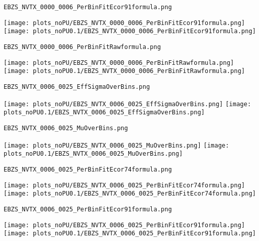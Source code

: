 \begin{frame}[fragile]
\begin{verbatim}
EBZS_NVTX_0000_0006_PerBinFitEcor91formula.png
\end{verbatim}
\texttt{[image: plots\_noPU/EBZS\_NVTX\_0000\_0006\_PerBinFitEcor91formula.png]}
\texttt{[image: plots\_noPU0.1/EBZS\_NVTX\_0000\_0006\_PerBinFitEcor91formula.png]}
\end{frame}
\begin{frame}[fragile]
\begin{verbatim}
EBZS_NVTX_0000_0006_PerBinFitRawformula.png
\end{verbatim}
\texttt{[image: plots\_noPU/EBZS\_NVTX\_0000\_0006\_PerBinFitRawformula.png]}
\texttt{[image: plots\_noPU0.1/EBZS\_NVTX\_0000\_0006\_PerBinFitRawformula.png]}
\end{frame}
\begin{frame}[fragile]
\begin{verbatim}
EBZS_NVTX_0006_0025_EffSigmaOverBins.png
\end{verbatim}
\texttt{[image: plots\_noPU/EBZS\_NVTX\_0006\_0025\_EffSigmaOverBins.png]}
\texttt{[image: plots\_noPU0.1/EBZS\_NVTX\_0006\_0025\_EffSigmaOverBins.png]}
\end{frame}
\begin{frame}[fragile]
\begin{verbatim}
EBZS_NVTX_0006_0025_MuOverBins.png
\end{verbatim}
\texttt{[image: plots\_noPU/EBZS\_NVTX\_0006\_0025\_MuOverBins.png]}
\texttt{[image: plots\_noPU0.1/EBZS\_NVTX\_0006\_0025\_MuOverBins.png]}
\end{frame}
\begin{frame}[fragile]
\begin{verbatim}
EBZS_NVTX_0006_0025_PerBinFitEcor74formula.png
\end{verbatim}
\texttt{[image: plots\_noPU/EBZS\_NVTX\_0006\_0025\_PerBinFitEcor74formula.png]}
\texttt{[image: plots\_noPU0.1/EBZS\_NVTX\_0006\_0025\_PerBinFitEcor74formula.png]}
\end{frame}
\begin{frame}[fragile]
\begin{verbatim}
EBZS_NVTX_0006_0025_PerBinFitEcor91formula.png
\end{verbatim}
\texttt{[image: plots\_noPU/EBZS\_NVTX\_0006\_0025\_PerBinFitEcor91formula.png]}
\texttt{[image: plots\_noPU0.1/EBZS\_NVTX\_0006\_0025\_PerBinFitEcor91formula.png]}
\end{frame}
